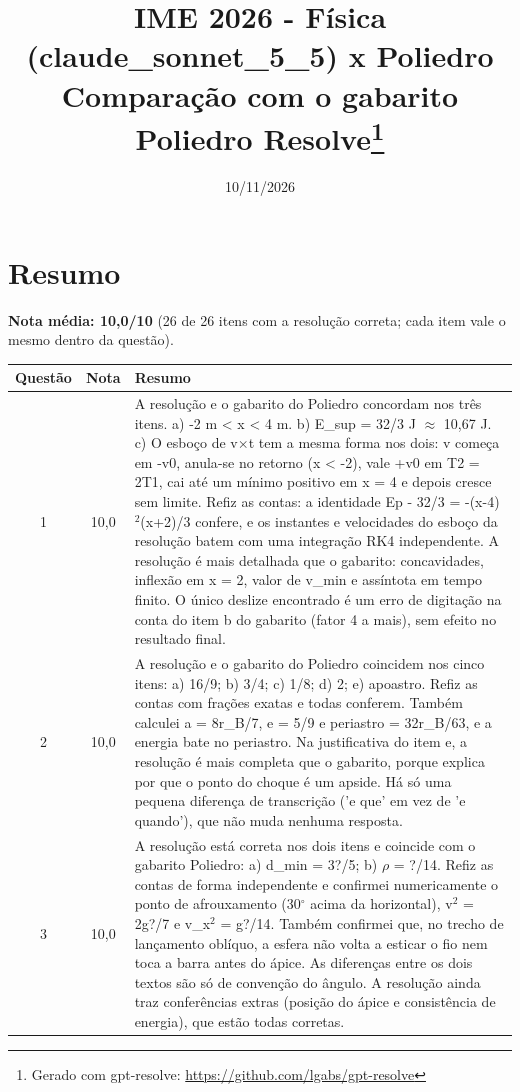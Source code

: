 \documentclass{article}%
\title{IME 2026 {-} Física (claude\_sonnet\_5\_5) x Poliedro\\[4pt]\large Comparação com o gabarito Poliedro Resolve\thanks{Gerado com gpt-resolve: \url{https://github.com/lgabs/gpt-resolve}}}%
\date{10/11/2026}%
\begin{document}
%
\normalsize%
\maketitle%
\section*{Resumo}\textbf{Nota média: 10,0/10} (26 de 26 itens com a resolução correta; cada item vale o mesmo dentro da questão).\par\medskip%
\begin{longtable}{@{}c c p{}@{}}\toprule Questão & Nota & Resumo \\ \midrule
1 & 10,0 & A resolução e o gabarito do Poliedro concordam nos três itens. a) -2 m < x < 4 m. b) E\_sup = 32/3 J $\approx$ 10,67 J. c) O esboço de v$\times$t tem a mesma forma nos dois: v começa em -v0, anula{-}se no retorno (x < -2), vale +v0 em T2 = 2T1, cai até um mínimo positivo em x = 4 e depois cresce sem limite. Refiz as contas: a identidade Ep - 32/3 = -(x-4)$^2$(x+2)/3 confere, e os instantes e velocidades do esboço da resolução batem com uma integração RK4 independente. A resolução é mais detalhada que o gabarito: concavidades, inflexão em x = 2, valor de v\_min e assíntota em tempo finito. O único deslize encontrado é um erro de digitação na conta do item b do gabarito (fator 4 a mais), sem efeito no resultado final. \\
2 & 10,0 & A resolução e o gabarito do Poliedro coincidem nos cinco itens: a) 16/9; b) 3/4; c) 1/8; d) 2; e) apoastro. Refiz as contas com frações exatas e todas conferem. Também calculei a = 8r\_B/7, e = 5/9 e periastro = 32r\_B/63, e a energia bate no periastro. Na justificativa do item e, a resolução é mais completa que o gabarito, porque explica por que o ponto do choque é um apside. Há só uma pequena diferença de transcrição ('e que' em vez de 'e quando'), que não muda nenhuma resposta. \\
3 & 10,0 & A resolução está correta nos dois itens e coincide com o gabarito Poliedro: a) d\_min = 3?/5; b) $\rho$ = ?/14. Refiz as contas de forma independente e confirmei numericamente o ponto de afrouxamento (30$^\circ$ acima da horizontal), v$^2$ = 2g?/7 e v\_x$^2$ = g?/14. Também confirmei que, no trecho de lançamento oblíquo, a esfera não volta a esticar o fio nem toca a barra antes do ápice. As diferenças entre os dois textos são só de convenção do ângulo. A resolução ainda traz conferências extras (posição do ápice e consistência de energia), que estão todas corretas. \\

\end{longtable}
\end{document}
